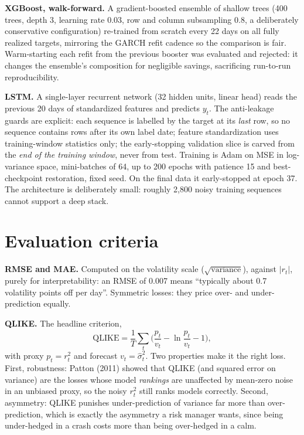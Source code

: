 \documentclass[a4paper,11pt]{article}
\newcommand{\term}[1]{\textbf{#1}}
\begin{document}
\term{XGBoost, walk-forward.} A gradient-boosted ensemble of shallow trees (400 trees, depth 3, learning rate 0.03, row and column subsampling 0.8, a deliberately conservative configuration) re-trained from scratch every 22 days on all fully realized targets, mirroring the GARCH refit cadence so the comparison is fair. Warm-starting each refit from the previous booster was evaluated and rejected: it changes the ensemble's composition for negligible savings, sacrificing run-to-run reproducibility.

\term{LSTM.} A single-layer recurrent network (32 hidden units, linear head) reads the previous 20 days of standardized features and predicts $y_t$. The anti-leakage guards are explicit: each sequence is labelled by the target at its \emph{last} row, so no sequence contains rows after its own label date; feature standardization uses training-window statistics only; the early-stopping validation slice is carved from the \emph{end of the training window}, never from test. Training is Adam on MSE in log-variance space, mini-batches of 64, up to 200 epochs with patience 15 and best-checkpoint restoration, fixed seed. On the final data it early-stopped at epoch 37. The architecture is deliberately small: roughly 2{,}800 noisy training sequences cannot support a deep stack.

\section{Evaluation criteria}

\term{RMSE and MAE.} Computed on the volatility scale ($\sqrt{\text{variance}}$), against $|r_t|$, purely for interpretability: an RMSE of 0.007 means ``typically about 0.7 volatility points off per day''. Symmetric losses: they price over- and under-prediction equally.

\term{QLIKE.} The headline criterion,
\begin{equation}
\mathrm{QLIKE}=\frac{1}{T}\sum_t\Big(\frac{p_t}{v_t}-\ln\frac{p_t}{v_t}-1\Big),
\label{eq:qlike}
\end{equation}
with proxy $p_t=r_t^2$ and forecast $v_t=\hat\sigma_t^2$. Two properties make it the right loss. First, robustness: Patton (2011) showed that QLIKE (and squared error on variance) are the losses whose model \emph{rankings} are unaffected by mean-zero noise in an unbiased proxy, so the noisy $r_t^2$ still ranks models correctly. Second, asymmetry: QLIKE punishes under-prediction of variance far more than over-prediction, which is exactly the asymmetry a risk manager wants, since being under-hedged in a crash costs more than being over-hedged in a calm.
\end{document}
